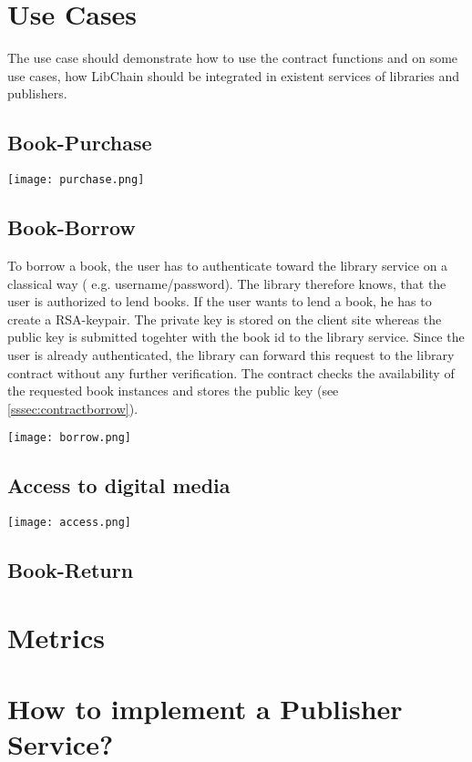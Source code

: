 \section{Use Cases}
The use case should demonstrate how to use the contract functions and on some use cases, how LibChain should be integrated in existent services of libraries and publishers.

\subsection{Book-Purchase}

\vspace{0.3cm}
\texttt{[image: purchase.png]}
\subsection{Book-Borrow}
To borrow a book, the user has to authenticate toward the library service on a classical way ( e.g. username/password). The library therefore knows, that the user is authorized to lend books. If the user wants to lend a book, he has to create a RSA-keypair. The private key is stored on the client site whereas the public key is submitted togehter with the book id to the library service.
Since the user is already authenticated, the library can forward this request to the library contract without any further verification.
The contract checks the availability of the requested book instances and stores the public key (see \ref{sssec:contractborrow}).

\vspace{0.3cm}
\texttt{[image: borrow.png]}


\subsection{Access to digital media \label{sssec:access}}
\vspace{0.3cm}
\texttt{[image: access.png]}


\subsection{Book-Return}

\section{Metrics}

\section{How to implement a Publisher Service?}

